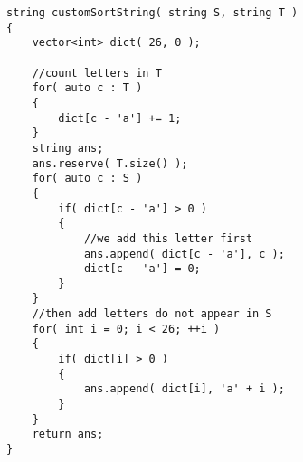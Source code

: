 \setcounter{lstlisting}{0}
\begin{lstlisting}[style=customc, caption={Count And Write}]
string customSortString( string S, string T )
{
    vector<int> dict( 26, 0 );

    //count letters in T
    for( auto c : T )
    {
        dict[c - 'a'] += 1;
    }
    string ans;
    ans.reserve( T.size() );
    for( auto c : S )
    {
        if( dict[c - 'a'] > 0 )
        {
            //we add this letter first
            ans.append( dict[c - 'a'], c );
            dict[c - 'a'] = 0;
        }
    }
    //then add letters do not appear in S
    for( int i = 0; i < 26; ++i )
    {
        if( dict[i] > 0 )
        {
            ans.append( dict[i], 'a' + i );
        }
    }
    return ans;
}
\end{lstlisting}